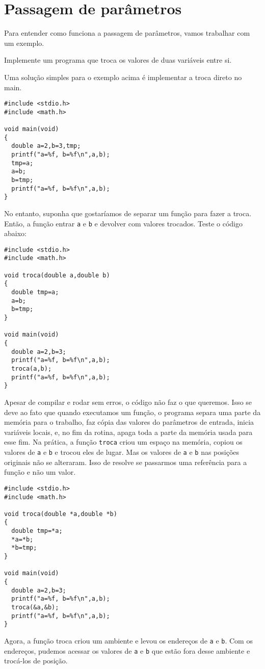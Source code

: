 \section{Passagem de parâmetros}
Para entender como funciona a passagem de parâmetros, vamos trabalhar com um exemplo.
\begin{ex}
Implemente um programa que troca os valores de duas variáveis entre si.
\end{ex}
Uma solução simples para o exemplo acima é implementar a troca direto no main.
\begin{verbatim}
#include <stdio.h>
#include <math.h>

void main(void)
{
  double a=2,b=3,tmp;
  printf("a=%f, b=%f\n",a,b);
  tmp=a;
  a=b;
  b=tmp;
  printf("a=%f, b=%f\n",a,b);
}
\end{verbatim}
No entanto, suponha que gostaríamos de separar um função para fazer a troca. Então, a função entrar \verb|a| e \verb|b| e devolver com valores trocados. Teste o código abaixo:
\begin{verbatim}
#include <stdio.h>
#include <math.h>

void troca(double a,double b)
{
  double tmp=a;
  a=b;
  b=tmp;
}

void main(void)
{
  double a=2,b=3;
  printf("a=%f, b=%f\n",a,b);
  troca(a,b);
  printf("a=%f, b=%f\n",a,b);
}
\end{verbatim}
Apesar de compilar e rodar sem erros, o código não faz o que queremos. Isso se deve ao fato que quando executamos um função, o programa separa uma parte da memória para o trabalho, faz cópia das valores do parâmetros de entrada, inicia variáveis locais, e, no fim da rotina, apaga toda a parte da memória usada para esse fim. Na prática, a função \verb|troca| criou um espaço na memória, copiou os valores de \verb|a| e \verb|b| e trocou eles de lugar. Mas os valores de \verb|a| e \verb|b| nas posições originais não se alteraram. Isso de resolve se passarmos uma referência para a função e não um valor.
\begin{verbatim}
#include <stdio.h>
#include <math.h>

void troca(double *a,double *b)
{
  double tmp=*a;
  *a=*b;
  *b=tmp;
}

void main(void)
{
  double a=2,b=3;
  printf("a=%f, b=%f\n",a,b);
  troca(&a,&b);
  printf("a=%f, b=%f\n",a,b);
}
\end{verbatim}
Agora, a função troca criou um ambiente e levou os endereços de \verb|a| e \verb|b|. Com os endereços, pudemos acessar os valores de \verb|a| e \verb|b| que estão fora desse ambiente e trocá-los de posição. 


